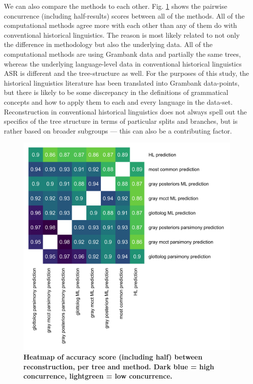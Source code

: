 \documentclass[12pt,letterpaper]{article}
\begin{document}
We can also compare the methods to each other. Fig. \ref{heatmap_accuracy_score_methods} shows the pairwise concurrence (including half-results) scores between all of the methods. All of the computational methods agree more with each other than any of them do with conventional historical linguistics. The reason is most likely related to not only the difference in methodology but also the underlying data. All of the computational methods are using Grambank data and partially the same trees, whereas the underlying language-level data in conventional historical linguistics ASR is different and the tree-structure as well. For the purposes of this study, the historical linguistics literature has been translated into Grambank data-points, but there is likely to be some discrepancy in the definitions of grammatical concepts and how to apply them to each and every language in the data-set. Reconstruction in conventional historical linguistics does not always spell out the specifics of the tree structure in terms of particular splits and branches, but is rather based on broader subgroups --- this can also be a contributing factor.


\begin{figure}[ht]
\centering
\includegraphics[width=17cm]{illustrations/plots_from_R/results/dist_heatmap_all_methods.png}
\caption{\textbf{Heatmap of accuracy score (including half) between reconstruction, per tree and method. Dark blue = high concurrence, lightgreen = low concurrence.}}
\label{heatmap_accuracy_score_methods}
\end{figure}
\end{document}
